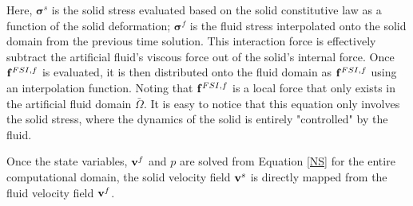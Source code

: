 Here, $\boldsymbol\sigma^s$ is the solid stress evaluated based on the solid constitutive law as a function of the solid deformation; $\boldsymbol\sigma^f$ is the fluid stress interpolated onto the solid domain from the previous time solution. This interaction force is effectively subtract the artificial fluid's viscous force out of the solid's internal force. Once $\bold{f}^{FSI,f}$ is evaluated, it is then distributed onto the fluid domain as $\bold{f}^{FSI,f}$ using an interpolation function. Noting that $\bold{f}^{FSI,f}$ is a local force that only exists in the artificial fluid domain $\bar\Omega$. It is easy to notice that this equation only involves the solid stress, where the dynamics of the solid is entirely "controlled" by the fluid.

Once the state variables, $\bold{v}^f$ and $p$ are solved from Equation \ref{NS} for the entire computational domain, the solid velocity field $\bold{v}^s$ is directly mapped from the fluid velocity field $\bold{v}^f$.